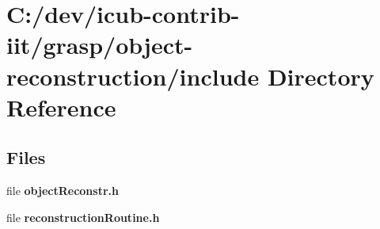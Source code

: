 \section{C\+:/dev/icub-\/contrib-\/iit/grasp/object-\/reconstruction/include Directory Reference}
\label{dir_0e496b94e65178671688c5163a0d89fe}
\subsection*{Files}
\begin{DoxyCompactItemize}
\item 
file {\bfseries object\+Reconstr.\+h}
\item 
file {\bfseries reconstruction\+Routine.\+h}
\end{DoxyCompactItemize}
